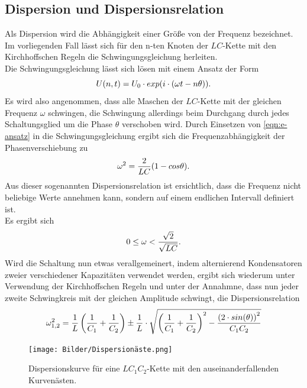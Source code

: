 \subsection{Dispersion und Dispersionsrelation}
\label{subsec-dispersion}
Als Dispersion wird die Abhängigkeit einer Größe von der Frequenz bezeichnet.
Im vorliegenden Fall lässt sich für den n-ten Knoten der $LC$-Kette mit den Kirchhoffschen Regeln die Schwingungsgleichung herleiten.\\
Die Schwingungsgleichung lässt sich lösen mit einem Ansatz der Form
\begin{equation}
	\centering
	U(n,t)=U_{\mathrm{0}} \cdot exp(i\cdot( \omega t- n\theta )).
	\label{eqn:e-ansatz}
\end{equation}
Es wird also angenommen, dass alle Maschen der $LC$-Kette mit der gleichen Frequenz $\omega$ schwingen, die Schwingung allerdings beim Durchgang durch jedes Schaltungsglied um die Phase $\theta$ verschoben wird.
Durch Einsetzen von \eqref{eqn:e-ansatz} in die Schwingungsgleichung ergibt sich die Frequenzabhängigkeit der Phasenverschiebung zu
\begin{equation}
	\centering
	\omega^2=\frac{2}{LC}(1-cos{\theta}).
	\label{eqn:dispersion}
\end{equation}
Aus dieser sogenannten Dispersionsrelation ist ersichtlich, dass die Frequenz \omega nicht beliebige Werte annehmen kann,
sondern auf einem endlichen Intervall definiert ist.\\
Es ergibt sich
\begin{equation*}
	\centering
	0\leq \omega<\frac{\sqrt{2}}{\sqrt{LC}}.
\end{equation*}
Wird die Schaltung nun etwas verallgemeinert, indem alternierend Kondensatoren zweier verschiedener Kapazitäten verwendet werden,
ergibt sich wiederum unter Verwendung der Kirchhoffschen Regeln und unter der Annahmne, dass nun jeder zweite Schwingkreis mit der gleichen Amplitude
schwingt, die Dispersionsrelation
\begin{equation}
	\centering
	\omega_{1,2}^2=\frac{1}{L}\left ( \frac{1}{C_{\mathrm{1}}}+\frac{1}{C_{\mathrm{2}}} \right ) \pm \frac{1}{L} \cdot \sqrt{\left ( \frac{1}{C_{\mathrm{1}}}+\frac{1}{C_{\mathrm{2}}} \right )^2-\frac{\left(2\cdot sin(\theta)\right)^2}{C_{\mathrm{1}}C_{\mathrm{2}}}}
	\label{eqn:dispersion2}
\end{equation}
\begin{figure}
	\centering
	\texttt{[image: Bilder/Dispersionäste.png]}
	\caption{Dispersionskurve für eine $LC_{\mathrm{1}}C_{\mathrm{2}}$-Kette mit den auseinanderfallenden Kurvenästen. \cite{Anleitung}}
	\label{fig:dispersionskurve}
\end{figure}
